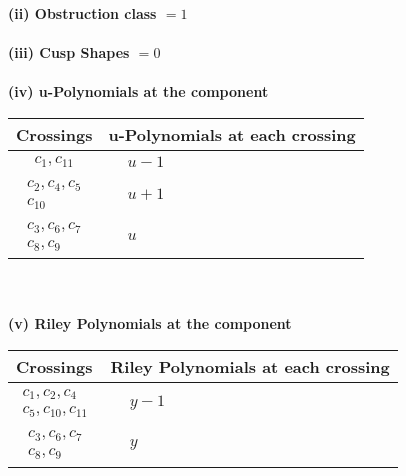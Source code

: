 \documentclass[1p]{elsarticle_modified}
\theoremstyle{definition}
\begin{document}
\flushleft \textbf{(ii) Obstruction class $= 1$}\\~\\
\flushleft \textbf{(iii) Cusp Shapes $= 0$}\\~\\
\newpage\renewcommand{\arraystretch}{1}
\flushleft \textbf{(iv) u-Polynomials at the component}\newline \\
\begin{tabular}{m{50pt}|m{274pt}}
Crossings & \hspace{64pt}u-Polynomials at each crossing \\
\hline $$\begin{aligned}c_{1},c_{11}\end{aligned}$$&$\begin{aligned}
&u-1
\end{aligned}$\\
\hline $$\begin{aligned}c_{2},c_{4},c_{5}\\c_{10}\end{aligned}$$&$\begin{aligned}
&u+1
\end{aligned}$\\
\hline $$\begin{aligned}c_{3},c_{6},c_{7}\\c_{8},c_{9}\end{aligned}$$&$\begin{aligned}
&u
\end{aligned}$\\
\hline
\end{tabular}\\~\\
\newpage\renewcommand{\arraystretch}{1}
\flushleft \textbf{(v) Riley Polynomials at the component}\newline \\
\begin{tabular}{m{50pt}|m{274pt}}
Crossings & \hspace{64pt}Riley Polynomials at each crossing \\
\hline $$\begin{aligned}c_{1},c_{2},c_{4}\\c_{5},c_{10},c_{11}\end{aligned}$$&$\begin{aligned}
&y-1
\end{aligned}$\\
\hline $$\begin{aligned}c_{3},c_{6},c_{7}\\c_{8},c_{9}\end{aligned}$$&$\begin{aligned}
&y
\end{aligned}$\\
\hline
\end{tabular}\\~\\
\end{document}
